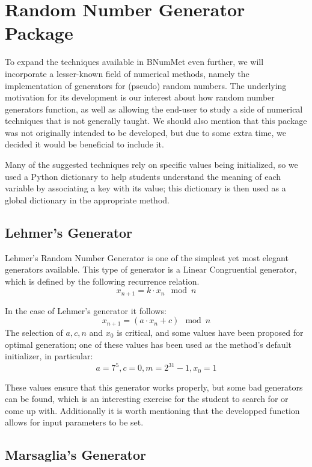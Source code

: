 \section{Random Number Generator Package}
To expand the techniques available in BNumMet even further, we will incorporate a lesser-known field of numerical methods, namely the implementation of generators for (pseudo) random numbers. The underlying motivation for its development is our interest about how random number generators function, as well as allowing the end-user to study a side of numerical techniques that is not generally taught. We should also mention that this package was not originally intended to be developed, but due to some extra time, we decided it would be beneficial to include it.

Many of the suggested techniques rely on specific values being initialized, so we used a Python dictionary to help students understand the meaning of each variable by associating a key with its value; this dictionary is then used as a global dictionary in the appropriate method.

\subsection{Lehmer's Generator}
Lehmer's Random Number Generator is one of the simplest yet most elegant generators available. This type of generator is a Linear Congruential generator, which is defined by the following recurrence relation. \cite{payne1969coding} \cite{park1988random}
\[x_{n+1} = k\cdot x_n \mod{n}\]

In the case of Lehmer's generator it follows:
\[x_{n+1} = (a\cdot x_n+c) \mod{n}\]
The selection of $a,c,n$ and $x_0$ is critical, and some values have been proposed for optimal generation; one of these values has been used as the method's default initializer, in particular:
\[a= 7^5, c=0, m=2^{31}-1, x_0 = 1 \]

These values ensure that this generator works properly, but some bad generators can be found, which is an interesting exercise for the student to search for or come up with. Additionally it is worth mentioning that the developped function allows for input parameters to be set.

\subsection{Marsaglia's Generator}

